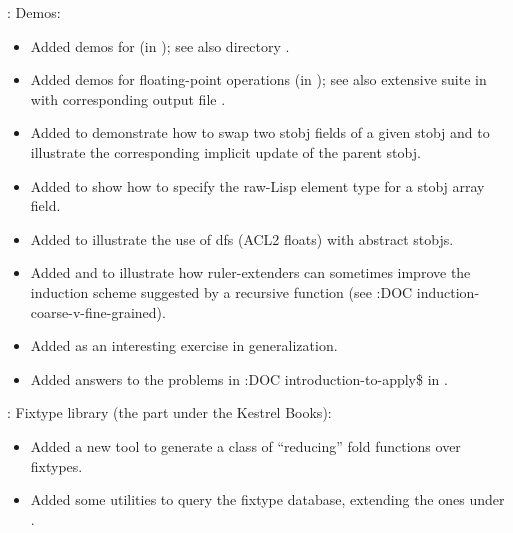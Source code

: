 \begin{frame}

\implibtitle

:
Demos:
\begin{itemize}
\item Added demos for  (in
      );
      see also directory .
\item Added demos for floating-point operations (in );
      see also extensive suite in 
      with corresponding output file .
\item Added  to demonstrate how
      to swap two stobj fields of a given stobj and to illustrate the
      corresponding implicit update of the parent stobj.
\item Added  to show how to specify
      the raw-Lisp  element type for a stobj array field.
\item Added  to illustrate
      the use of dfs (ACL2 floats) with abstract stobjs.
\item Added  and
       to illustrate how
      ruler-extenders can sometimes improve the induction scheme
      suggested by a recursive function (see :DOC
      induction-coarse-v-fine-grained).
\item Added  as an interesting exercise in
      generalization.
\item Added answers to the problems in :DOC introduction-to-apply\$ in
      .
\end{itemize}

\end{frame}


\begin{frame}

\implibtitle

:
Fixtype library (the part under the Kestrel Books):
\begin{itemize}
\item Added a new  tool
      to generate a class of ``reducing'' fold functions over fixtypes.
\item Added some utilities to query the fixtype database,
      extending the ones under .
\end{itemize}

\end{frame}

